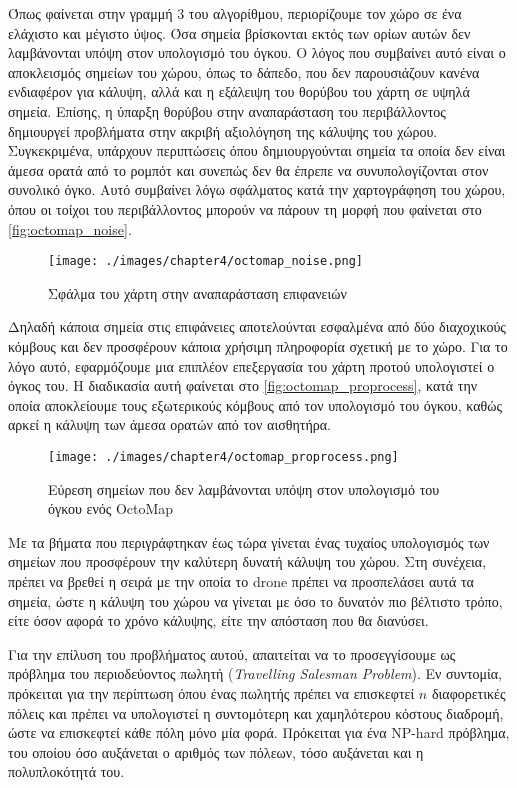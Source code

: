 Όπως φαίνεται στην γραμμή 3 του αλγορίθμου, περιορίζουμε τον χώρο σε ένα ελάχιστο και μέγιστο ύψος. Όσα σημεία βρίσκονται εκτός των ορίων αυτών δεν λαμβάνονται υπόψη στον υπολογισμό του όγκου. Ο λόγος που συμβαίνει αυτό είναι ο αποκλεισμός σημείων του χώρου, όπως το δάπεδο, που δεν παρουσιάζουν κανένα ενδιαφέρον για κάλυψη, αλλά και η εξάλειψη του θορύβου του χάρτη σε υψηλά σημεία. Επίσης, η ύπαρξη θορύβου στην αναπαράσταση του περιβάλλοντος δημιουργεί προβλήματα στην ακριβή αξιολόγηση της κάλυψης του χώρου. Συγκεκριμένα, υπάρχουν περιπτώσεις όπου δημιουργούνται σημεία τα οποία δεν είναι άμεσα ορατά από το ρομπότ και συνεπώς δεν θα έπρεπε να συνυπολογίζονται στον συνολικό όγκο. Αυτό συμβαίνει λόγω σφάλματος κατά την χαρτογράφηση του χώρου, όπου οι τοίχοι του περιβάλλοντος μπορούν να πάρουν τη μορφή που φαίνεται στο \autoref{fig:octomap_noise}.

\begin{figure}[!ht]
    \centering
    \texttt{[image: ./images/chapter4/octomap\_noise.png]}
    \caption{Σφάλμα του χάρτη στην αναπαράσταση επιφανειών}
    \label{fig:octomap_noise}
\end{figure}

Δηλαδή κάποια σημεία στις επιφάνειες αποτελούνται εσφαλμένα από δύο διαχοχικούς κόμβους και δεν προσφέρουν κάποια χρήσιμη πληροφορία σχετική με το χώρο. Για το λόγο αυτό, εφαρμόζουμε μια επιπλέον επεξεργασία του χάρτη προτού υπολογιστεί ο όγκος του. Η διαδικασία αυτή φαίνεται στο \autoref{fig:octomap_proprocess}, κατά την οποία αποκλείουμε τους εξωτερικούς κόμβους από τον υπολογισμό του όγκου, καθώς αρκεί η κάλυψη των άμεσα ορατών από τον αισθητήρα.

\begin{figure}[!ht]
    \centering
    \texttt{[image: ./images/chapter4/octomap\_proprocess.png]}
    \caption{Εύρεση σημείων που δεν λαμβάνονται υπόψη στον υπολογισμό του όγκου ενός OctoMap}
    \label{fig:octomap_proprocess}
\end{figure}

Με τα βήματα που περιγράφτηκαν έως τώρα γίνεται ένας τυχαίος υπολογισμός των σημείων που προσφέρουν την καλύτερη δυνατή κάλυψη του χώρου. Στη συνέχεια, πρέπει να βρεθεί η σειρά με την οποία το drone πρέπει να προσπελάσει αυτά τα σημεία, ώστε η κάλυψη του χώρου να γίνεται με όσο το δυνατόν πιο βέλτιστο τρόπο, είτε όσον αφορά το χρόνο κάλυψης, είτε την απόσταση που θα διανύσει. 

Για την επίλυση του προβλήματος αυτού, απαιτείται να το προσεγγίσουμε ως πρόβλημα του περιοδεύοντος πωλητή (\emph{Travelling Salesman Problem}). Εν συντομία, πρόκειται για την περίπτωση όπου ένας πωλητής πρέπει να επισκεφτεί $n$ διαφορετικές πόλεις και πρέπει να υπολογιστεί η συντομότερη και χαμηλότερου κόστους διαδρομή, ώστε να επισκεφτεί κάθε πόλη μόνο μία φορά. Πρόκειται για ένα NP-hard πρόβλημα, του οποίου όσο αυξάνεται ο αριθμός των πόλεων, τόσο αυξάνεται και η πολυπλοκότητά του. 

